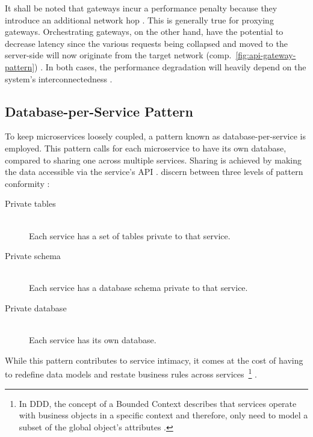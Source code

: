 \FloatBarrier

It shall be noted that gateways incur a performance penalty because they introduce an additional network hop \cite[p.~37]{messina2016simplified}. This is generally true for proxying gateways. Orchestrating gateways, on the other hand, have the potential to decrease latency since the various requests being collapsed and moved to the server-side will now originate from the target network (comp.~\autoref{fig:api-gateway-pattern}) \cite{netflix2013api}. In both cases, the performance degradation will heavily depend on the system's interconnectedness \cite[p.~9]{dragoni2017microservices}.


\subsection{Database-per-Service Pattern}
\label{sec:database-per-service-pattern}

To keep microservices loosely coupled, a pattern known as database-per-service is employed. This pattern calls for each microservice to have its own database, compared to sharing one across multiple services. Sharing is achieved by making the data accessible via the service's \acs{API} \cite[p.~36]{messina2016simplified} \cite[p.~59]{taibi2018definition}. \citeauthor{messina2016simplified} discern between three levels of pattern conformity \cite[p.~37]{messina2016simplified}:

\begin{description}
  \item[Private tables]
  \hfill \\
  Each service has a set of tables private to that service.

  \item[Private schema]
  \hfill \\
  Each service has a database schema private to that service.

  \item[Private database]
  \hfill \\
  Each service has its own database.
\end{description}

While this pattern contributes to service intimacy, it comes at the cost of having to redefine data models and restate business rules across services~\footnote{In \acl{DDD}, the concept of a Bounded Context describes that services operate with business objects in a specific context and therefore, only need to model a subset of the global object's attributes \cite[p.~30]{cerny2018contextual}.} \cite[p.~30]{cerny2018contextual}.


